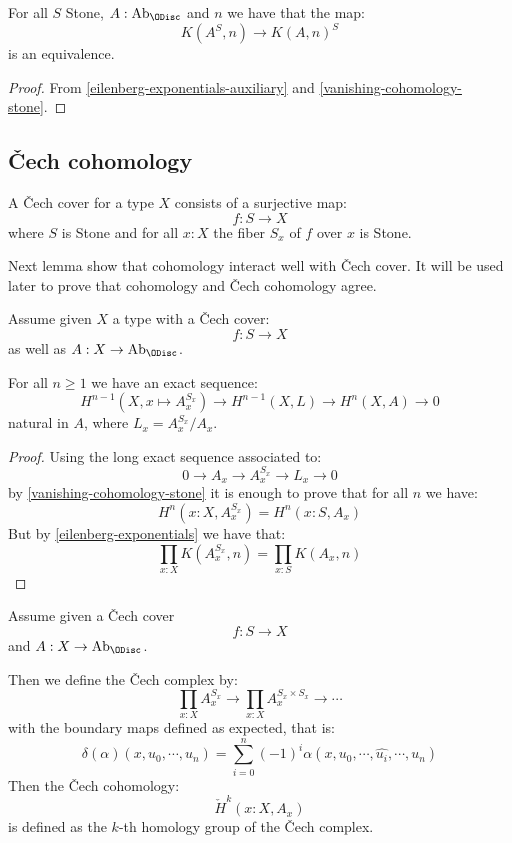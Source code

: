 \begin{corollary}\label{eilenberg-exponentials}
For all $S$ Stone, $A:\mathrm{Ab}_\ODisc$ and $n$ we have that the map:
\[K(A^S,n) \to K(A,n)^S\]
is an equivalence.
\end{corollary}

\begin{proof}
From \cref{eilenberg-exponentials-auxiliary} and \cref{vanishing-cohomology-stone}.
\end{proof}


\subsection{\v{C}ech cohomology}

\begin{definition}
A \v{C}ech cover for a type $X$ consists of a surjective map:
\[f:S\to X\]
where $S$ is Stone and for all $x:X$ the fiber $S_x$ of $f$ over $x$ is Stone.
\end{definition}

Next lemma show that cohomology interact well with \v{C}ech cover. It will be used later to prove that cohomology and \v{C}ech cohomology agree.

\begin{lemma}\label{inductive-definition-cohomology}
Assume given $X$ a type with a \v{C}ech cover:
\[f:S\to X\]
as well as $A:X\to \mathrm{Ab}_\ODisc$.

For all $n\geq 1$ we have an exact sequence:
\[H^{n-1}(X,x\mapsto A_x^{S_x}) \to H^{n-1}(X,L)\to H^n(X,A)\to 0\]
natural in $A$, where $L_x = A_x^{S_x}/A_x$.
\end{lemma}

\begin{proof}
Using the long exact sequence associated to:
\[0\to A_x\to A_x^{S_x}\to L_x\to 0\]
by \cref{vanishing-cohomology-stone} it is enough to prove that for all $n$ we have:
\[H^n(x:X,A_x^{S_x}) = H^n(x:S,A_x)\]
But by \cref{eilenberg-exponentials} we have that:
\[\prod_{x:X}K(A_x^{S_x},n) = \prod_{x:S}K(A_x,n)\]
\end{proof}

\begin{definition}\label{cech-sequence-definition}
Assume given a \v{C}ech cover
\[f:S\to X\]
and $A:X\to\mathrm{Ab}_\ODisc$.

Then we define the \v{C}ech complex by:
\[\prod_{x:X}A_x^{S_x} \to \prod_{x:X}A_x^{S_x\times S_x} \to \cdots\]
with the boundary maps defined as expected, that is:
\[\delta(\alpha)(x,u_0,\cdots,u_n) = \sum_{i=0}^n (-1)^i\alpha(x,u_0,\cdots,\hat{u_i},\cdots,u_n)\]
Then the \v{C}ech cohomology:
\[\check{H}^k(x:X,A_x)\]
is defined as the $k$-th homology group of the \v{C}ech complex.
\end{definition}

